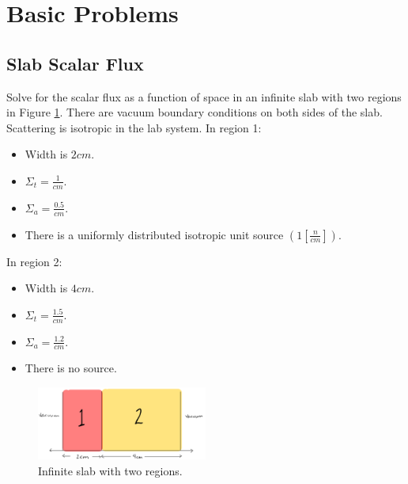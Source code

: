 \documentclass[12pts]{exam}
\begin{document}
\pagebreak

\section{Basic Problems}\label{sec:basic}
   \subsection{Slab Scalar Flux} 
   Solve for the scalar flux as a function of space in an infinite slab with 
   two regions in Figure \ref{fig:slab}.  There are vacuum boundary conditions 
   on both sides of the slab.  Scattering is isotropic in the lab system.  
        In region 1:
        \begin{itemize}
                \item Width is $2cm$.
                \item $\Sigma_t = \frac{1}{cm}$.
                \item $\Sigma_a = \frac{0.5}{cm}$.
                \item There is a uniformly distributed isotropic unit source $\left(1\left[\frac{n}{cm}\right]\right)$.
        \end{itemize}


        In region 2:
        \begin{itemize}
                \item Width is $4cm$.
                \item $\Sigma_t = \frac{1.5}{cm}$.
                \item $\Sigma_a = \frac{1.2}{cm}$.
                \item There is no source.
        \end{itemize}

        \begin{figure}[htb!]
                \begin{center}
                        \includegraphics[width=0.5\textwidth]{slab-prob.png}
                \end{center}
                \caption{Infinite slab with two regions.}
                \label{fig:slab}
        \end{figure}
\end{document}

